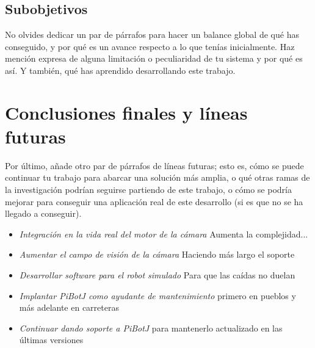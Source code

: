 \subsection{Subobjetivos}

No olvides dedicar un par de párrafos para hacer un balance global de qué has conseguido, y por qué es un avance respecto a lo que tenías inicialmente. Haz mención expresa de alguna limitación o peculiaridad de tu sistema y por qué es así. Y también, qué has aprendido desarrollando este trabajo.\\




\section{Conclusiones finales y líneas futuras}


Por último, añade otro par de párrafos de líneas futuras; esto es, cómo se puede continuar tu trabajo para abarcar una solución más amplia, o qué otras ramas de la investigación podrían seguirse partiendo de este trabajo, o cómo se podría mejorar para conseguir una aplicación real de este desarrollo (si es que no se ha llegado a conseguir).


\begin{itemize}
	\item \textit{Integración en la vida real del motor de la cámara} Aumenta la complejidad...
	\item \textit{Aumentar el campo de visión de la cámara} Haciendo más largo el soporte
	\item \textit{Desarrollar software para el robot simulado} Para que las caídas no duelan
	\item \textit{Implantar PiBotJ como ayudante de mantenimiento} primero en pueblos y más adelante en carreteras
	\item \textit{Continuar dando soporte a PiBotJ} para mantenerlo actualizado en las últimas versiones
\end{itemize}\

